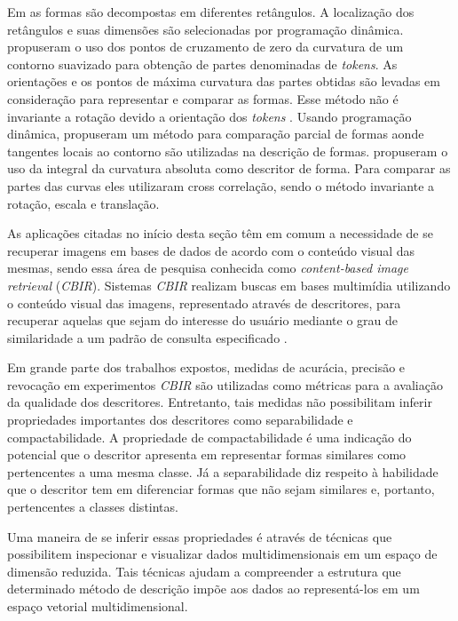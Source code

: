 Em \cite{Kenji:1992} as formas são decompostas em diferentes retângulos. A localização dos retângulos e suas dimensões são selecionadas por programação dinâmica.  propuseram o uso dos pontos de cruzamento de zero da curvatura de um contorno suavizado para obtenção de partes denominadas de \textit{tokens}. As orientações e os pontos de máxima curvatura das partes obtidas são levadas em consideração para representar e comparar as formas. Esse método não é invariante a rotação devido a orientação dos \textit{tokens} \cite{DiRuberto:2009}. Usando programação dinâmica,  propuseram um método para comparação parcial de formas aonde tangentes locais ao contorno são utilizadas na descrição de formas.  propuseram o uso da integral da curvatura absoluta como descritor de forma. Para comparar as partes das curvas eles utilizaram cross correlação, sendo o método invariante a rotação, escala e translação.  

As aplicações citadas no início desta seção têm em comum a necessidade de se recuperar imagens em bases de dados de acordo com o conteúdo visual das mesmas, sendo essa área de pesquisa conhecida como \textit{content-based image retrieval} (\textit{CBIR}). Sistemas \textit{CBIR} realizam buscas em bases multimídia utilizando o conteúdo visual das imagens, representado através de descritores, para recuperar aquelas que sejam do interesse do usuário mediante o grau de similaridade a um padrão de consulta especificado \cite{Feng:2003}. 

Em grande parte dos trabalhos expostos, medidas de acurácia, precisão e revocação em experimentos \textit{CBIR} são utilizadas como métricas para a avaliação da qualidade dos descritores. Entretanto, tais medidas não possibilitam inferir propriedades importantes dos descritores como separabilidade e compactabilidade. A propriedade de compactabilidade é uma indicação do potencial que o descritor apresenta em representar formas similares como pertencentes a uma mesma classe. Já a separabilidade diz respeito à habilidade que o descritor tem em diferenciar formas que não sejam similares e, portanto, pertencentes a classes distintas. 

Uma maneira de se inferir essas propriedades é através de técnicas que possibilitem inspecionar e visualizar dados multidimensionais em um espaço de dimensão reduzida. Tais técnicas ajudam a compreender a estrutura que determinado método de descrição impõe aos dados ao representá-los em um espaço vetorial multidimensional.

